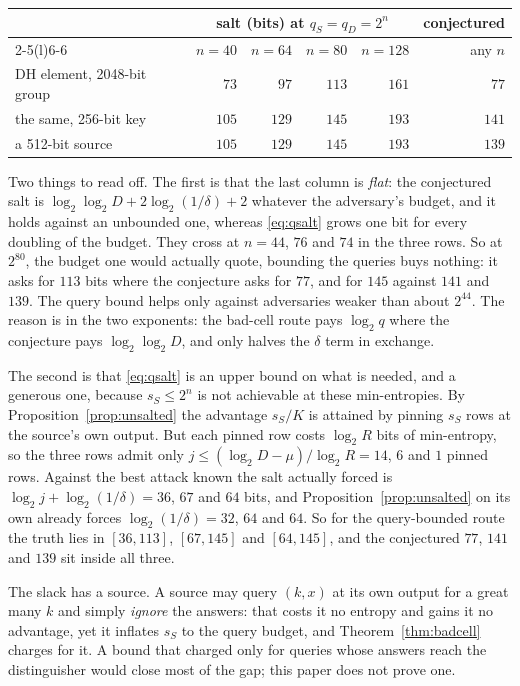\documentclass{aicr-solution}
\begin{document}
\begin{center}\small
\begin{tabular}{@{}lrrrrr@{}}
\toprule
 & \multicolumn{4}{c}{salt (bits) at $q_S = q_D = 2^{n}$} & conjectured \\
\cmidrule(lr){2-5}\cmidrule(l){6-6}
 & $n = 40$ & $n = 64$ & $n = 80$ & $n = 128$ & any $n$ \\
\midrule
DH element, 2048-bit group & $73$  & $97$  & $113$ & $161$ & $77$  \\
the same, 256-bit key      & $105$ & $129$ & $145$ & $193$ & $141$ \\
a 512-bit source           & $105$ & $129$ & $145$ & $193$ & $139$ \\
\bottomrule
\end{tabular}
\end{center}

Two things to read off. The first is that the last column is \emph{flat}: the conjectured salt is
$\log_2\log_2 D + 2\log_2(1/\delta) + 2$ whatever the adversary's budget, and it holds against an
unbounded one, whereas \eqref{eq:qsalt} grows one bit for every doubling of the budget. They cross
at $n = 44$, $76$ and $74$ in the three rows. So at $2^{80}$, the budget one would actually quote,
bounding the queries buys nothing: it asks for $113$ bits where the conjecture asks for $77$, and
for $145$ against $141$ and $139$. The query bound helps only against adversaries weaker than about
$2^{44}$. The reason is in the two exponents: the bad-cell route pays $\log_2 q$ where the
conjecture pays $\log_2\log_2 D$, and only halves the $\delta$ term in exchange.

The second is that \eqref{eq:qsalt} is an upper bound on what is needed, and a generous one, because
$s_S \le 2^{n}$ is not achievable at these min-entropies. By Proposition~\ref{prop:unsalted} the
advantage $s_S/K$ is attained by pinning $s_S$ rows at the source's own output. But each pinned row
costs $\log_2 R$ bits of min-entropy, so the three rows admit only
$j \le (\log_2 D - \mu)/\log_2 R = 14$, $6$ and $1$ pinned rows. Against the best attack known the
salt actually forced is $\log_2 j + \log_2(1/\delta) = 36$, $67$ and $64$ bits, and
Proposition~\ref{prop:unsalted} on its own already forces $\log_2(1/\delta) = 32$, $64$ and $64$. So
for the query-bounded route the truth lies in $[36,113]$, $[67,145]$ and $[64,145]$, and the
conjectured $77$, $141$ and $139$ sit inside all three.

The slack has a source. A source may query $(k,x)$ at its own output for a great many $k$ and simply \emph{ignore} the
answers: that costs it no entropy and gains it no advantage, yet it inflates $s_S$ to the query
budget, and Theorem~\ref{thm:badcell} charges for it. A bound that charged only for queries whose
answers reach the distinguisher would close most of the gap; this paper does not prove one.
\end{document}

